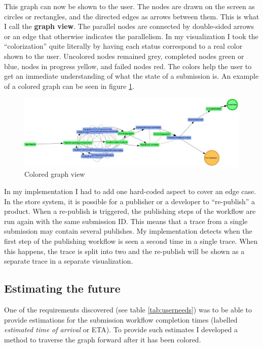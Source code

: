 This graph can now be shown to the user.
The nodes are drawn on the screen as circles or rectangles, and the directed edges as arrows between them.
This is what I call the \textbf{graph view}.
The parallel nodes are connected by double-sided arrows or an edge that otherwise indicates the parallelism.
In my visualization I took the ``colorization'' quite literally by having each status correspond to a real color shown to the user.
Uncolored nodes remained grey, completed nodes green or blue, nodes in progress yellow, and failed nodes red.
The colors help the user to get an immediate understanding of what the state of a submission is.
An example of a colored graph can be seen in figure \ref{fig:coloredgraph}.

\begin{figure}[htb]
    \centering \includegraphics[width=0.9\linewidth]{gfx/screenshots/graphcolor.png}
    \caption{Colored graph view}
    \label{fig:coloredgraph}
\end{figure}

In my implementation I had to add one hard-coded aspect to cover an edge case. 
In the store system, it is possible for a publisher or a developer to ``re-publish'' a product. 
When a re-publish is triggered, the publishing steps of the workflow are run again with the same submission ID. 
This means that a trace from a single submission may contain several publishes.
My implementation detects when the first step of the publishing workflow is seen a second time in a single trace. 
When this happens, the trace is split into two and the re-publish will be shown as a separate trace in a separate visualization.

\subsection{Estimating the future}

One of the requirements discovered (see table \ref{tab:userneeds}) was to be able to provide estimations for the submission workflow completion times (labelled \emph{estimated time of arrival} or ETA). 
To provide such estimates I developed a method to traverse the graph forward after it has been colored.

